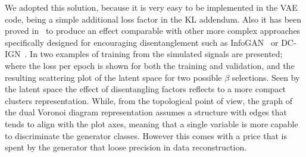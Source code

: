 %
We adopted this solution, because it is very easy to be implemented in the \acs{VAE} code, being a simple additional loss factor in the KL addendum. Also it has been proved in~\cite{Higgins2017betaVAELB} to produce an effect comparable with other more complex approaches specifically designed for encouraging disentanglement such as InfoGAN~\cite{NIPS2016_6399} or DC-IGN~\cite{kulkarni2015deep}. 
In \Figure{\ref{fig:step1_ls_regularization}} two examples of training from the simulated signals are presented; where the loss per epoch is shown for both the training and validation, and the resulting scattering plot of the latent space for two possible $\beta$ selections.
Seen by the latent space the effect of disentangling factors reflects to a more compact clusters representation. While, from the topological point of view, the graph of the dual Voronoi diagram representation assumes a structure with edges that tends to align with the plot axes, meaning that a single variable is more capable to discriminate the generator classes.
However this comes with a price that is spent by the generator that loose precision in data reconstruction.

